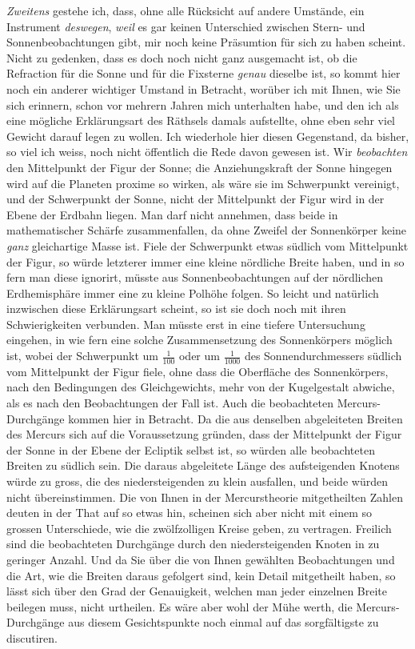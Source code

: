 \par\indent \emph{Zweitens} gestehe ich, dass, ohne alle Rücksicht auf andere Umstände, ein Instrument \emph{deswegen}, \emph{weil} es gar keinen Unterschied zwischen Stern- und Sonnenbeobachtungen gibt, mir noch keine Präsumtion für sich zu haben scheint. Nicht zu gedenken, dass es doch noch nicht ganz ausgemacht ist, ob die Refraction für die Sonne und für die Fixsterne \emph{genau} dieselbe ist, so kommt hier noch ein anderer wichtiger Umstand in Betracht, worüber ich mit Ihnen, wie Sie sich erinnern, schon vor mehrern Jahren mich unterhalten habe, und den ich als eine mögliche Erklärungsart des Räthsels damals aufstellte, ohne eben sehr viel Gewicht darauf legen zu wollen. Ich wiederhole hier diesen Gegenstand, da bisher, so viel ich weiss, noch nicht öffentlich die Rede davon gewesen ist. Wir \emph{beobachten} den Mittelpunkt der Figur der Sonne; die Anziehungskraft der Sonne hingegen wird auf die Planeten proxime so wirken, als wäre sie im Schwerpunkt vereinigt, und der Schwerpunkt der Sonne, nicht der Mittelpunkt der Figur wird in der Ebene der Erdbahn liegen. Man darf nicht annehmen, dass beide in mathematischer Schärfe zusammenfallen, da ohne Zweifel der Sonnenkörper keine \emph{ganz} gleichartige Masse ist. Fiele der Schwerpunkt etwas südlich vom Mittelpunkt der Figur, so würde letzterer immer  eine kleine nördliche Breite haben, und in so fern man diese ignorirt, müsste aus
Sonnenbeobachtungen auf der nördlichen Erdhemisphäre immer eine zu kleine Polhöhe
folgen. So leicht und natürlich inzwischen diese Erklärungsart scheint, so ist sie
doch noch mit ihren Schwierigkeiten verbunden. Man müsste erst in eine tiefere
Untersuchung eingehen, in wie fern eine solche Zusammensetzung des Sonnenkörpers
möglich ist, wobei der Schwerpunkt um $\frac{1}{100}$ oder um $\frac{1}{1000}$ des
Sonnendurchmessers südlich vom Mittelpunkt der Figur fiele, ohne dass die Oberfläche
des Sonnenkörpers, nach den Bedingungen des Gleichgewichts, mehr von der Kugelgestalt
abwiche, als es nach den Beobachtungen der Fall ist. Auch die beobachteten
Mercurs-Durchgänge kommen hier in Betracht. Da die aus denselben abgeleiteten Breiten
des Mercurs sich auf die Voraussetzung gründen, dass der Mittelpunkt der Figur der
Sonne in der Ebene der Ecliptik selbst ist, so würden alle beobachteten Breiten zu
südlich sein. Die daraus abgeleitete Länge des aufsteigenden Knotens würde zu gross,
die des niedersteigenden zu klein ausfallen, und beide würden nicht übereinstimmen.
Die von Ihnen in der Mercurstheorie mitgetheilten Zahlen deuten in der That auf so
etwas hin, scheinen sich aber nicht mit einem so grossen Unterschiede, wie die
zwölfzolligen Kreise geben, zu vertragen. Freilich sind die beobachteten Durchgänge
durch den niedersteigenden Knoten in zu geringer Anzahl. Und da Sie über die von
Ihnen gewählten Beobachtungen und die Art, wie die Breiten daraus gefolgert sind,
kein Detail mitgetheilt haben, so lässt sich über den Grad der Genauigkeit, welchen
man jeder einzelnen Breite beilegen muss, nicht urtheilen. Es wäre aber wohl der
Mühe werth, die Mercurs-Durchgänge aus diesem Gesichtspunkte noch einmal auf das
sorgfältigste zu discutiren.

